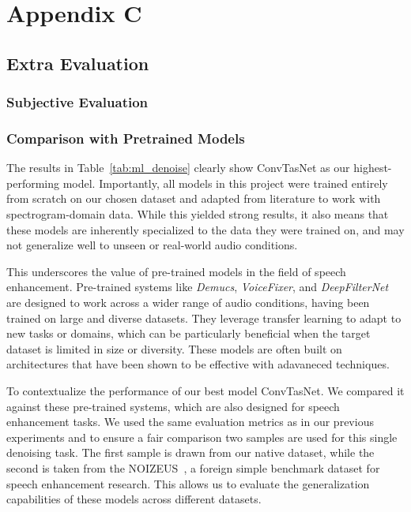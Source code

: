 \graphicspath{{content/appendices/figures}}
\chapter{Appendix C}
\label{appendix:appendix_c}

\section{Extra Evaluation}
\label{sec:extra_evaluation}

\subsection{Subjective Evaluation}
\label{sec:subjective_evaluation}


\subsection{Comparison with Pretrained Models}
\label{sec:pretrained_comparison}

The results in Table~\ref{tab:ml_denoise} clearly show ConvTasNet as our highest-performing model. Importantly, all models in this project were trained entirely from scratch on our chosen dataset and adapted from literature to work with spectrogram-domain data. While this yielded strong results, it also means that these models are inherently specialized to the data they were trained on, and may not generalize well to unseen or real-world audio conditions.

This underscores the value of pre-trained models in the field of speech enhancement. Pre-trained systems like \textit{Demucs}, \textit{VoiceFixer}, and \textit{DeepFilterNet} are designed to work across a wider range of audio conditions, having been trained on large and diverse datasets. They leverage transfer learning to adapt to new tasks or domains, which can be particularly beneficial when the target dataset is limited in size or diversity. These models are often built on architectures that have been shown to be effective with adavaneced techniques.

To contextualize the performance of our best model ConvTasNet. We compared it against these pre-trained systems, which are also designed for speech enhancement tasks. We used the same evaluation metrics as in our previous experiments and to ensure a fair comparison two samples are used for this single denoising task. The first sample is drawn from our native dataset, while the second is taken from the NOIZEUS~\cite{hu2007subjective}, a foreign simple benchmark dataset for speech enhancement research. This allows us to evaluate the generalization capabilities of these models across different datasets.

